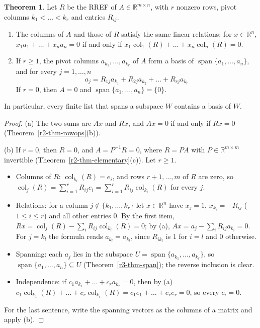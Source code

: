 \documentclass[12pt]{article}
\newcommand{\R}{\mathbb R}
\DeclareMathOperator{\col}{col}
\DeclareMathOperator{\Span}{span}
\theoremstyle{definition}
\newtheorem{theorem}{Theorem}
\begin{document}
\begin{theorem}\label{thm:r4-pivot-columns}
Let \(R\) be the RREF of \(A\in\R^{m\times n}\), with \(r\) nonzero rows, pivot columns
\(k_1<\dots<k_r\) and entries \(R_{ij}\).
\begin{enumerate}
\item The columns of \(A\) and those of \(R\) satisfy the same linear relations: for
\(x\in\R^n\), \(x_1a_1+\dots+x_na_n=0\) if and only if \(x_1\col_1(R)+\dots+x_n\col_n(R)=0\).
\item If \(r\geqslant1\), the pivot columns \(a_{k_1},\dots,a_{k_r}\) of \(A\) form a basis of
\(\Span\{a_1,\dots,a_n\}\), and for every \(j=1,\dots,n\)
\[
a_j=R_{1j}a_{k_1}+R_{2j}a_{k_2}+\dots+R_{rj}a_{k_r}
\]
If \(r=0\), then \(A=0\) and \(\Span\{a_1,\dots,a_n\}=\{0\}\).
\end{enumerate}
In particular, every finite list that spans a subspace \(W\) contains a basis of \(W\).
\end{theorem}
\begin{proof}
(a) The two sums are \(Ax\) and \(Rx\), and \(Ax=0\) if and only if \(Rx=0\) (Theorem~\ref{r2-thm-rowops}(b)).

(b) If \(r=0\), then \(R=0\), and \(A=P^{-1}R=0\), where \(R=PA\) with \(P\in\R^{m\times m}\)
invertible (Theorem~\ref{r2-thm-elementary}(c)). Let \(r\geqslant1\).
\begin{itemize}
\item Columns of \(R\): \(\col_{k_i}(R)=e_i\), and rows \(r+1,\dots,m\) of \(R\) are zero, so
\(\col_j(R)=\sum_{i=1}^rR_{ij}e_i=\sum_{i=1}^rR_{ij}\col_{k_i}(R)\) for every \(j\).
\item Relations: for a column \(j\notin\{k_1,\dots,k_r\}\) let \(x\in\R^n\) have \(x_j=1\),
\(x_{k_i}=-R_{ij}\) (\(1\leqslant i\leqslant r\)) and all other entries \(0\). By the first item,
\(Rx=\col_j(R)-\sum_iR_{ij}\col_{k_i}(R)=0\); by (a), \(Ax=a_j-\sum_iR_{ij}a_{k_i}=0\). For
\(j=k_l\) the formula reads \(a_{k_l}=a_{k_l}\), since \(R_{ik_l}\) is \(1\) for \(i=l\) and \(0\)
otherwise.
\item Spanning: each \(a_j\) lies in the subspace \(U=\Span\{a_{k_1},\dots,a_{k_r}\}\), so
\(\Span\{a_1,\dots,a_n\}\subseteq U\) (Theorem~\ref{r3-thm-span}); the reverse inclusion is clear.
\item Independence: if \(c_1a_{k_1}+\dots+c_ra_{k_r}=0\), then by (a)
\(c_1\col_{k_1}(R)+\dots+c_r\col_{k_r}(R)=c_1e_1+\dots+c_re_r=0\), so every \(c_i=0\).
\end{itemize}
For the last sentence, write the spanning vectors as the columns of a matrix and apply (b).
\end{proof}
\end{document}

